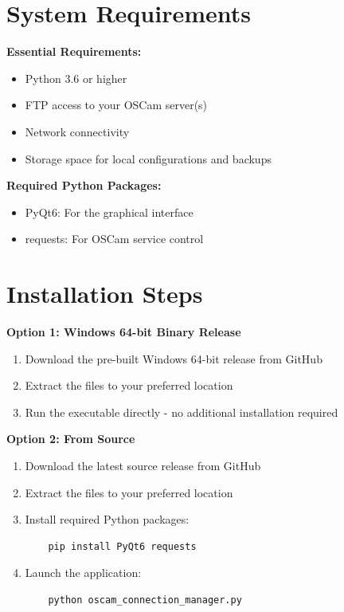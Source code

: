 \documentclass[a4paper,11pt]{report}
\begin{document}
\section{System Requirements}
\begin{procedurebox}
\textbf{Essential Requirements:}
\begin{itemize}
    \item Python 3.6 or higher
    \item FTP access to your OSCam server(s)
    \item Network connectivity
    \item Storage space for local configurations and backups
\end{itemize}

\textbf{Required Python Packages:}
\begin{itemize}
    \item PyQt6: For the graphical interface
    \item requests: For OSCam service control
\end{itemize}
\end{procedurebox}

\section{Installation Steps}
\begin{procedurebox}
\textbf{Option 1: Windows 64-bit Binary Release}
\begin{enumerate}
    \item Download the pre-built Windows 64-bit release from GitHub
    \item Extract the files to your preferred location
    \item Run the executable directly - no additional installation required
\end{enumerate}

\textbf{Option 2: From Source}
\begin{enumerate}
    \item Download the latest source release from GitHub
    \item Extract the files to your preferred location
    \item Install required Python packages:
    \begin{verbatim}
    pip install PyQt6 requests
    \end{verbatim}
    \item Launch the application:
    \begin{verbatim}
    python oscam_connection_manager.py
    \end{verbatim}
\end{enumerate}
\end{procedurebox}
\end{document}
